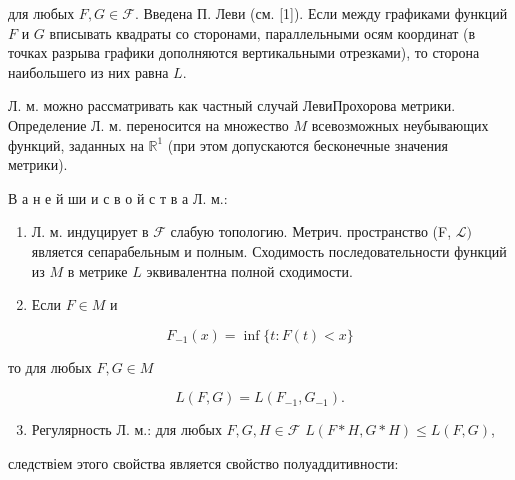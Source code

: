 \documentclass[10pt]{article}
\begin{document}
для любых $F, G \in \mathscr{F}$. Введена П. Леви (см. [1]). Если между графиками функций $F$ и $G$ вписывать квадраты со сторонами, параллельными осям координат (в точках разрыва графики дополняются вертикальными отрезками), то сторона наибольшего из них равна $L$.



Л. м. можно рассматривать как частный случай ЛевиПрохорова метрики. Определение Л. м. переносится на множество $M$ всевозможных неубывающих функций, заданных на $\mathbb{R}^{1}$ (при этом допускаются бесконечные значения метрики).



В а н е й ши и с в о й с т в а Л. м.:



\begin{enumerate}

  \item Л. м. индуцирует в $\mathscr{F}$ слабую топологию. Метрич. пространство (F, $\mathscr{L})$ является сепарабельным и полным. Сходимость последовательности функций из $M$ в метрике $L$ эквивалентна полной сходимости.



  \item Если $F \in M$ и



\end{enumerate}



\[

F_{-1}(x)=\inf \{t: F(t)<x\}

\]



то для любых $F, G \in M$



\[

L(F, G)=L\left(F_{-1}, G_{-1}\right) .

\]



\begin{enumerate}

  \setcounter{enumi}{2}

  \item Регулярность Л. м.: для любых $F, G, H \in \mathscr{F}$ $L(F * H, G * H) \leqslant L(F, G)$,

\end{enumerate}



следствіем этого свойства является свойство полуаддитивности:
\end{document}
